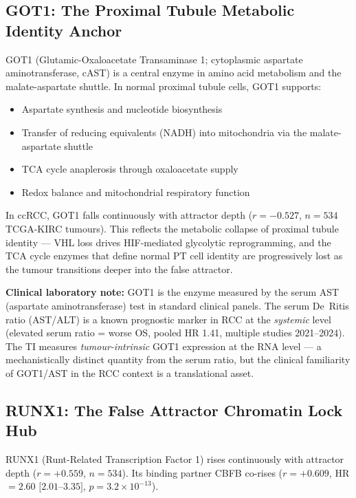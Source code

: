 \documentclass[11pt, a4paper]{article}
\begin{document}
\subsection{GOT1: The Proximal Tubule
Metabolic Identity Anchor}

GOT1 (Glutamic-Oxaloacetate Transaminase 1;
cytoplasmic aspartate aminotransferase, cAST)
is a central enzyme in amino acid metabolism
and the malate-aspartate shuttle. In normal
proximal tubule cells, GOT1 supports:

\begin{itemize}
    \item Aspartate synthesis and
    nucleotide biosynthesis
    \item Transfer of reducing equivalents
    (NADH) into mitochondria via the
    malate-aspartate shuttle
    \item TCA cycle anaplerosis through
    oxaloacetate supply
    \item Redox balance and mitochondrial
    respiratory function
\end{itemize}

In ccRCC, GOT1 falls continuously with
attractor depth ($r = -0.527$, $n = 534$
TCGA-KIRC tumours). This reflects the
metabolic collapse of proximal tubule
identity --- VHL loss drives HIF-mediated
glycolytic reprogramming, and the TCA cycle
enzymes that define normal PT cell identity
are progressively lost as the tumour
transitions deeper into the false attractor.

\textbf{Clinical laboratory note:}
GOT1 is the enzyme measured by the serum AST
(aspartate aminotransferase) test in standard
clinical panels. The serum De~Ritis ratio
(AST/ALT) is a known prognostic marker in RCC
at the \textit{systemic} level (elevated serum
ratio = worse OS, pooled HR 1.41, multiple
studies 2021--2024). The TI measures
\textit{tumour-intrinsic} GOT1 expression
at the RNA level --- a mechanistically distinct
quantity from the serum ratio, but the clinical
familiarity of GOT1/AST in the RCC context
is a translational asset.

\subsection{RUNX1: The False Attractor
Chromatin Lock Hub}

RUNX1 (Runt-Related Transcription Factor 1)
rises continuously with attractor depth
($r = +0.559$, $n = 534$). Its binding
partner CBFB co-rises ($r = +0.609$,
HR $= 2.60$ $[2.01$--$3.35]$, $p = 3.2
\times 10^{-13}$).
\end{document}
